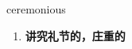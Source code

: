 
\begin{frame}
{\huge ceremonious}
\begin{center}
\begin{enumerate}\Large
  \item \textbf{讲究礼节的，庄重的}
\end{enumerate}
\end{center}
\end{frame}
